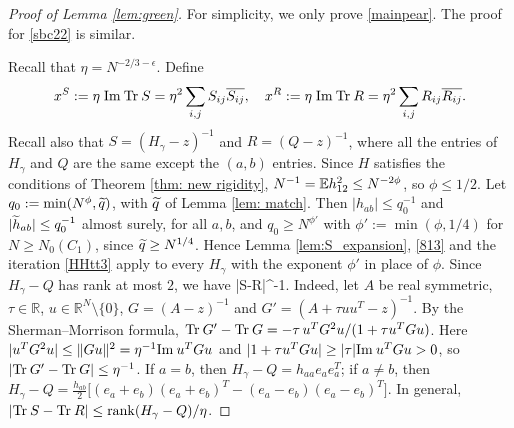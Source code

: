 \begin{proof}[Proof of Lemma \ref{lem:green}]
For simplicity, we only prove \eqref{mainpear}. The proof for \eqref{sbc22} is similar.

Recall that $\eta = N^{-2/3 - \epsilon}$. Define
\begin{equation}
x^S := \eta \; \mathrm{Im}\: \mathrm{Tr}\: S = \eta^2 \sum_{i, j} S_{ij} \overline{S_{ij}}, \quad x^R := \eta \; \mathrm{Im}\: \mathrm{Tr}\: R = \eta^2 \sum_{i, j} R_{ij} \overline{R_{ij}}.
\end{equation}
Recall also that $S=(H_\gamma-z)^{-1}$ and $R=(Q-z)^{-1}$, where all the entries of $H_{\gamma}$ and $Q$ are the same except the $(a,b)$ entries. Since $H$ satisfies the conditions of Theorem \ref{thm: new rigidity}, $N^{-1}=\mathbb{E} h_{12}^2\le N^{-2\phi}$, so $\phi\le1/2$. Let $q_0:=\min(N^{\phi},\widetilde q)$, with $\widetilde q$ of Lemma \ref{lem: match}. Then $|h_{ab}|\le q_0^{-1}$ and $|\widetilde h_{ab}|\le q_0^{-1}$ almost surely, for all $a,b$, and $q_0\ge N^{\phi'}$ with $\phi':=\min(\phi,1/4)$ for $N\ge N_0(C_1)$, since $\widetilde q\ge N^{1/4}$. Hence Lemma \ref{lem:S_expansion}, \eqref{813} and the iteration \eqref{HHtt3} apply to every $H_\gamma$ with the exponent $\phi'$ in place of $\phi$. Since $H_\gamma - Q$ has rank at most $2$, we have 
\be
|\tr S-\tr R|\eta^{-1}.
\ee
Indeed, let $A$ be real symmetric, $\tau\in\mathbb R$, $u\in\mathbb R^N\setminus\{0\}$, $G=(A-z)^{-1}$ and $G'=(A+\tau uu^T-z)^{-1}$. By the Sherman--Morrison formula, $\mathrm{Tr}\: G'-\mathrm{Tr}\: G=-\tau\, u^TG^2u/(1+\tau u^TGu)$. Here $|u^TG^2u|\le\|Gu\|^2=\eta^{-1}\mathrm{Im}\: u^TGu$ and $|1+\tau u^TGu|\ge|\tau|\mathrm{Im}\: u^TGu>0$, so $|\mathrm{Tr}\: G'-\mathrm{Tr}\: G|\le\eta^{-1}$. If $a=b$, then $H_\gamma-Q=h_{aa}e_ae_a^T$; if $a\ne b$, then $H_\gamma-Q=\frac{h_{ab}}{2}\big[(e_a+e_b)(e_a+e_b)^T-(e_a-e_b)(e_a-e_b)^T\big]$. In general, $|\mathrm{Tr}\: S-\mathrm{Tr}\: R|\le{\rm rank}(H_\gamma-Q)/\eta$.


\end{proof}
